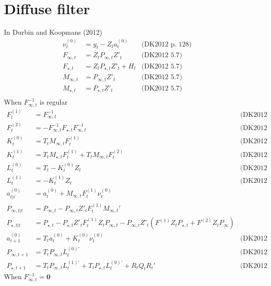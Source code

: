\documentclass{article}
\begin{document}
\section{Diffuse filter}
In Durbin and Koopmans (2012)
\begin{align*}
  \nu^{(0)}_t &= y_t - Z_t a^{(0)}_t & \mbox{(DK2012 p. 128)}\\
  F_{\infty,t} &= Z_tP_{\infty,t}Z'_t & \mbox{(DK2012 5.7)}\\
  F_{\star,t} &= Z_tP_{\star,t}Z'_t + H_t & \mbox{(DK2012 5.7)}\\
  M_{\infty,t } &= P_{\infty,t}Z'_t & \mbox{(DK2012 5.7)}\\
  M_{\star,t } &= P_{\star,t}Z'_t & \mbox{(DK2012 5.7)}\\
\end{align*}
When $F^{-1}_{\infty,t}$ is regular
\begin{align*}
  F^{(1)}_t &= F^{-1}_{\infty, t} & \mbox{(DK2012 5.10)}\\
  F^{(2)}_t &=  -F^{-1}_{\infty, t}F_{\star, t}F^{-1}_{\infty, t} & \mbox{(DK2012 5.10)}\\
  K^{(0)}_t &= T_tM_{\infty,t}F^{(1)}_t & \mbox{(DK2012 5.12)}\\
  K^{(1)}_t &= T_tM_{\star,t}F^{(1)}_t + T_tM_{\infty,t}F^{(2)}_t &
                                                                    \mbox{(DK2012 5.12)}\\
  L^{(0)}_t &= T_t - K^{(0)}_tZ_t & \mbox{(DK2012 5.12)}\\
  L^{(1)}_t &= - K^{(1)}_tZ_t & \mbox{(DK2012 5.12)}\\
  a^{(0)}_{t|t} &= a^{(0)}_t + M_{\infty,t}F^{(1)}_t\nu^{(0)}_t\\
  P_{\infty,t|t} &= P_{\infty,t} - P_{\infty,t}Z'_tF^{(1)}_tM_{\infty,t}' \\
  P_{\star,t|t} &= P_{\star,t} - P_{\star,t}Z'_t
                  F^{(1)}_tZ_tP_{\infty,t} -
                  P_{\infty,t}Z'_t(F^{(1)}Z_tP_{\star,t} + F^{(2)}Z_tP_{\infty})\\
  a^{(0)}_{t+1} &= T_ta^{(0)}_t + K^{(0)}_t\nu^{(0)}_t & \mbox{(DK2012 5.13)}\\
  P_{\infty,t+ 1} &= T_tP_{\infty,t}L^{(0)'}_t & \mbox{(DK2012 5.14)}\\
  P_{\star, t+1} &= T_tP_{\infty,t}L^{(1)'}_t + T_tP_{\star,t}L^{(0)'}_t + R_tQ_tR_t' & \mbox{(DK2012 5.14)}
\end{align*}
When $F^{-1}_{\infty,t} = \mathbf{0}$
\end{document}
